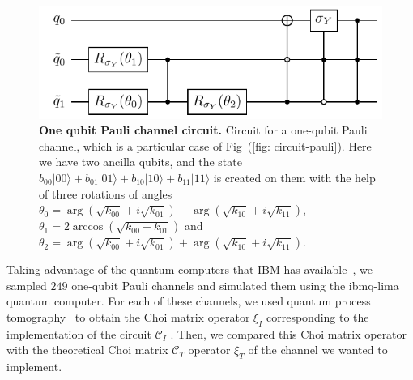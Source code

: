 \documentclass[10pt,letterpaper]{article} %
\begin{document}
\begin{figure}[h!]
\centering
\includegraphics{images/circuito_unqubit.pdf}
\caption{   
 {\bf One qubit Pauli channel circuit.} Circuit for a one-qubit Pauli channel, which is a particular case of Fig~(\ref{fig: circuit-pauli}).
Here we have two ancilla qubits, and the state 
$b_{00} |00\rangle + b_{01} |01\rangle + b_{10} |10\rangle + b_{11}|11\rangle$ 
is created on them with the help of three rotations of angles $\theta_0 = \arg(\sqrt{k_{00}} + i \sqrt{k_{01}}) - \arg(\sqrt{k_{10}} + i\sqrt{k_{11}})$, 
$ \theta_1 = 2 \arccos(\sqrt{k_{00} + k_{01}})$ and
$ \theta_2 = \arg(\sqrt{k_{00}} + i \sqrt{k_{01}}) + \arg(\sqrt{k_{10}} + i\sqrt{k_{11}})$. }
\label{fig: citcuit-pauli-1} 
\end{figure}
Taking advantage of the quantum computers that IBM has available~\cite{Qiskit},
we sampled $249$ one-qubit Pauli channels and simulated them using the 
ibmq-lima quantum computer. 
For each of these channels, we used quantum process tomography~\cite{Qiskit,
Chuang:1996} to obtain the {\color{red} Choi matrix} {\color{orange} operator $\xi_I$}  corresponding to the implementation of
the circuit {\color{red} $\mathcal{C}_{I}$} .
Then, we compared this {\color{red} Choi matrix} {\color{orange} operator} with the theoretical
{\color{red} Choi matrix $\mathcal{C}_T$} {\color{orange} operator $\xi_T$} 
of the channel we wanted to implement.
\end{document}

